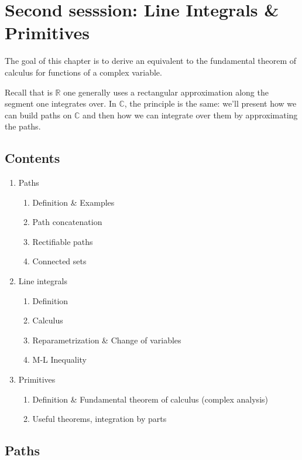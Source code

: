 \documentclass{article}
\begin{document}
\newpage
\section{Second sesssion: Line Integrals \& Primitives} 
The goal of this chapter is to derive an equivalent to the fundamental theorem of calculus for functions of a complex variable.

Recall that is $\mathbb{R}$ one generally uses a rectangular approximation along the segment one integrates over. In $\mathbb{C}$, the principle is the same: we'll present how we can build paths on $\mathbb{C}$ and then how we can integrate over them by approximating the paths.
\subsection*{Contents}
\begin{enumerate}
    \item Paths
        \begin{enumerate}
            \item Definition \& Examples
            \item Path concatenation
            \item Rectifiable paths
            \item Connected sets
        \end{enumerate}
    \item Line integrals 
        \begin{enumerate}
            \item Definition
            \item Calculus
            \item Reparametrization \& Change of variables
            \item M-L Inequality
        \end{enumerate}
    \item Primitives
        \begin{enumerate}
            \item Definition \& Fundamental theorem of calculus (complex analysis)
            \item Useful theorems, integration by parts
        \end{enumerate}
        
\end{enumerate}

\subsection{Paths}
\end{document}
